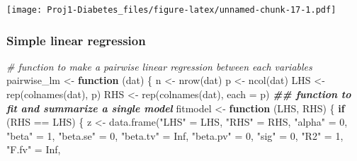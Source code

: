\documentclass[
]{article}
\newenvironment{Shaded}{\begin{snugshade}}{\end{snugshade}}
\newcommand{\AttributeTok}[1]{\textcolor[rgb]{0.77,0.63,0.00}{#1}}
\newcommand{\CommentTok}[1]{\textcolor[rgb]{0.56,0.35,0.01}{\textit{#1}}}
\newcommand{\ConstantTok}[1]{\textcolor[rgb]{0.00,0.00,0.00}{#1}}
\newcommand{\ControlFlowTok}[1]{\textcolor[rgb]{0.13,0.29,0.53}{\textbf{#1}}}
\newcommand{\DecValTok}[1]{\textcolor[rgb]{0.00,0.00,0.81}{#1}}
\newcommand{\DocumentationTok}[1]{\textcolor[rgb]{0.56,0.35,0.01}{\textbf{\textit{#1}}}}
\newcommand{\FunctionTok}[1]{\textcolor[rgb]{0.00,0.00,0.00}{#1}}
\newcommand{\NormalTok}[1]{#1}
\newcommand{\OtherTok}[1]{\textcolor[rgb]{0.56,0.35,0.01}{#1}}
\newcommand{\SpecialCharTok}[1]{\textcolor[rgb]{0.00,0.00,0.00}{#1}}
\newcommand{\StringTok}[1]{\textcolor[rgb]{0.31,0.60,0.02}{#1}}
\begin{document}
\begin{Shaded}
\end{Shaded}

\texttt{[image: Proj1-Diabetes\_files/figure-latex/unnamed-chunk-17-1.pdf]}

\hypertarget{simple-linear-regression}{%
\subsubsection{Simple linear
regression}\label{simple-linear-regression}}

\begin{Shaded}
\begin{Highlighting}[]
\CommentTok{\# function to make a pairwise linear regression between each variables}
\NormalTok{pairwise\_lm }\OtherTok{\textless{}{-}} \ControlFlowTok{function}\NormalTok{ (dat) \{}
\NormalTok{  n }\OtherTok{\textless{}{-}} \FunctionTok{nrow}\NormalTok{(dat)}
\NormalTok{  p }\OtherTok{\textless{}{-}} \FunctionTok{ncol}\NormalTok{(dat)}
\NormalTok{  LHS }\OtherTok{\textless{}{-}} \FunctionTok{rep}\NormalTok{(}\FunctionTok{colnames}\NormalTok{(dat), p)}
\NormalTok{  RHS }\OtherTok{\textless{}{-}} \FunctionTok{rep}\NormalTok{(}\FunctionTok{colnames}\NormalTok{(dat), }\AttributeTok{each =}\NormalTok{ p)}
  \DocumentationTok{\#\# function to fit and summarize a single model}
\NormalTok{  fitmodel }\OtherTok{\textless{}{-}} \ControlFlowTok{function}\NormalTok{ (LHS, RHS) \{}
    \ControlFlowTok{if}\NormalTok{ (RHS }\SpecialCharTok{==}\NormalTok{ LHS) \{}
\NormalTok{      z }\OtherTok{\textless{}{-}} \FunctionTok{data.frame}\NormalTok{(}\StringTok{"LHS"} \OtherTok{=}\NormalTok{ LHS, }\StringTok{"RHS"} \OtherTok{=}\NormalTok{ RHS,}
                      \StringTok{"alpha"} \OtherTok{=} \DecValTok{0}\NormalTok{,}
                      \StringTok{"beta"} \OtherTok{=} \DecValTok{1}\NormalTok{,}
                      \StringTok{"beta.se"} \OtherTok{=} \DecValTok{0}\NormalTok{,}
                      \StringTok{"beta.tv"} \OtherTok{=} \ConstantTok{Inf}\NormalTok{,}
                      \StringTok{"beta.pv"} \OtherTok{=} \DecValTok{0}\NormalTok{,}
                      \StringTok{"sig"} \OtherTok{=} \DecValTok{0}\NormalTok{,}
                      \StringTok{"R2"} \OtherTok{=} \DecValTok{1}\NormalTok{,}
                      \StringTok{"F.fv"} \OtherTok{=} \ConstantTok{Inf}\NormalTok{,}

\end{Highlighting}
\end{Shaded}
\end{document}
